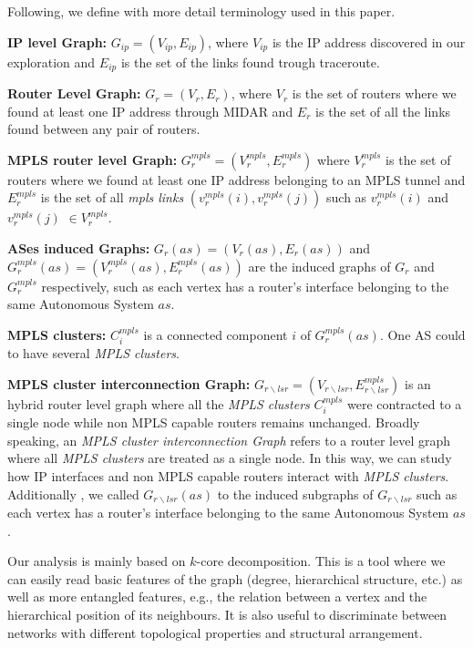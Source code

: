 Following,  we define with more detail terminology used in this paper. 

\textbf{IP level Graph:} $G_{ip}=(V_{ip}, E_{ip})$, where
$V_{ip}$ is the IP address discovered in our exploration and $E_{ip}$ is the set
of the links found trough traceroute.

\textbf{Router Level Graph:} $G_{r}=(V_{r}, E_{r})$, where $V_{r}$ is the set of routers where we found
at least one IP address through MIDAR and $E_{r}$ is the set of all the links found between
any pair of routers.

\textbf{MPLS router level Graph:} $G^{mpls}_{r}=(V^{mpls}_{r},
E^{mpls}_{r})$ where  $V^{mpls}_{r}$ is the set of routers where we found
at least one IP address belonging to an MPLS tunnel and  $E^{mpls}_{r}$ is the
set of all \textit{mpls links} $(v^{mpls}_{r}(i), v^{mpls}_{r}(j))$ such as
$v^{mpls}_{r}(i)$ and  $v^{mpls}_{r}(j)$  $\in V^{mpls}_{r}$.

\textbf{ASes induced Graphs:} $G_{r}(as)=(V_{r}(as), E_{r}(as))$ and $G^{mpls}_{r}(as)=(V^{mpls}_{r}(as),
E^{mpls}_{r}(as))$ are the induced graphs of $G_{r}$ and $G^{mpls}_{r}$
respectively, such as each  vertex has a router's interface belonging to the same Autonomous System $as$.

\textbf{MPLS clusters:} $C^{mpls}_{i}$ is a
connected component $i$ of $G^{mpls}_{r}(as)$. One AS could to have
several \textit{MPLS clusters}.    

\textbf{MPLS cluster interconnection Graph:} $G_{r\backslash lsr}=(V_{r\backslash lsr},
E^{mpls}_{r\backslash lsr})$ is an hybrid router level graph where all the \textit{MPLS clusters}  $C^{mpls}_{i}$ were contracted to a
single node while non MPLS capable routers remains unchanged. Broadly
speaking, an \textit{MPLS cluster interconnection Graph} refers to a router level graph where all \textit{MPLS clusters} are treated as a single node. In this way, we can study how IP
interfaces and non MPLS capable routers interact with \textit{MPLS clusters}. Additionally , we
called $G_{r\backslash lsr}(as)$ to the induced
subgraphs of $G_{r\backslash lsr}$  such
as each vertex  has a router's interface belonging to the same Autonomous System $as$.


Our analysis is mainly based on $k$-core decomposition. This is a tool where we can easily read basic features of the graph (degree, hierarchical structure, etc.) as well as more entangled features, e.g., the relation between a vertex and the hierarchical position of its neighbours. It is also useful to  discriminate between networks with different topological properties and structural arrangement. 

